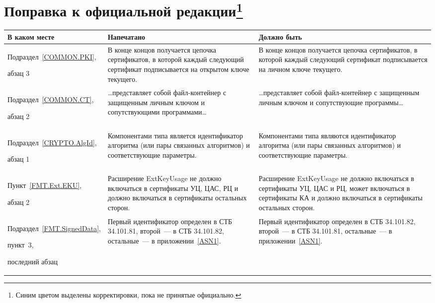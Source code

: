 \clearpage
\chapter*{\mbox{}\hfill Поправка к официальной редакции\footnote{
Синим цветом выделены корректировки, пока не принятые официально.
}\hfill\mbox{}}

\mbox{}

{\small
\begin{center}
\begin{longtable}{|p{2.9cm}|p{6.3cm}|p{6.5cm}|}
\hline
В каком месте & Напечатано & Должно быть\\
\hline
\hline
Подраздел~\ref{COMMON.PKI},\par 
абзац 3
&
В конце концов получается цепочка сертификатов, в которой каждый следующий 
сертификат подписывается на открытом ключе текущего.
&
В конце концов получается цепочка сертификатов, в которой каждый следующий 
сертификат подписывается на личном ключе текущего.
\\
%
\hline
Подраздел~\ref{COMMON.CT},\par 
абзац 2
&
\ldots представляет собой файл-контейнер с защищенным личным 
ключом и сопутствующими программами\ldots
&
\ldots представляет собой файл-контейнер с защищенным личным 
ключом и сопутствующие программы\ldots
\\
%
\hline
Подраздел~\ref{CRYPTO.AlgId},\par 
абзац 1
&
Компонентами типа является идентификатор алгоритма (или пары 
связанных алгоритмов) и соответствующие параметры. 
&
Компонентами типа являются идентификатор алгоритма (или пары 
связанных алгоритмов) и соответствующие параметры. 
\\
%
\hline
Пункт~\ref{FMT.Ext.EKU},\par 
абзац 2
&
Расширение ExtKeyUsage не должно включаться в сертификаты УЦ, ЦАС, РЦ 
и должно включаться в сертификаты остальных сторон.
&
Расширение ExtKeyUsage не должно включаться в сертификаты УЦ, ЦАС и РЦ,
может включаться в сертификаты КА и должно включаться в сертификаты остальных 
сторон.
\\
%
\hline
Подраздел~\ref{FMT.SignedData},\par пункт~3,\par 
последний абзац 
&
Первый идентификатор определен в СТБ 34.101.81, второй~--- в СТБ 
34.101.82, остальные~--- в приложении~\ref{ASN1}.
&
Первый идентификатор определен в СТБ 34.101.82, второй~--- в СТБ 
34.101.81, остальные~--- в приложении~\ref{ASN1}.
\\

\end{longtable}
\end{center}}
